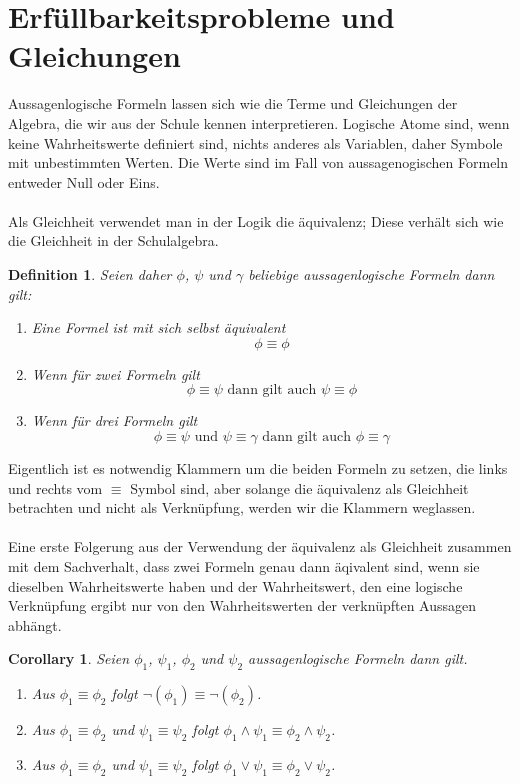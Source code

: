 \documentclass[11pt,a4paper,leqno]{report}
\newtheorem{definition}[theorem]{Definition}
\newtheorem{corollary}[theorem]{Corollary}
\numberwithin{equation}{chapter}
\begin{document}
\section{Erf\"ullbarkeitsprobleme und Gleichungen}
Aussagenlogische Formeln lassen sich wie die Terme und Gleichungen der Algebra, die wir aus der Schule kennen interpretieren. Logische Atome sind, wenn keine Wahrheitswerte definiert sind, nichts anderes als Variablen, daher Symbole mit unbestimmten Werten. Die Werte sind im Fall von aussagenogischen Formeln entweder Null oder Eins.\\
\\
Als Gleichheit verwendet man in der Logik die \"aquivalenz; Diese verh\"alt sich wie die Gleichheit in der Schulalgebra.
\begin{definition}
	Seien daher $\phi$, $\psi$ und $\gamma$ beliebige aussagenlogische Formeln dann gilt:
	\begin{enumerate}
		\item Eine Formel ist mit sich selbst \"aquivalent
		\begin{equation}
			\phi\equiv\phi
		\end{equation}
		\item Wenn f\"ur zwei Formeln gilt
		\begin{equation}
		\phi\equiv\psi \text{ dann gilt auch } \psi\equiv\phi
		\end{equation}
		\item Wenn f\"ur drei Formeln gilt
		\begin{equation}
		\phi\equiv\psi \text{ und } \psi\equiv\gamma\text{ dann gilt auch }\phi\equiv\gamma
		\end{equation}
	\end{enumerate}
\end{definition}
Eigentlich ist es notwendig Klammern um die beiden Formeln zu setzen, die links und rechts vom $\equiv$ Symbol sind, aber solange die \"aquivalenz als Gleichheit betrachten und nicht als Verkn\"upfung, werden wir die Klammern weglassen.
\\
\\
Eine erste Folgerung aus der Verwendung der \"aquivalenz als Gleichheit zusammen mit dem Sachverhalt, dass zwei Formeln genau dann \"aqivalent sind, wenn sie dieselben Wahrheitswerte haben und der Wahrheitswert, den eine logische Verkn\"upfung ergibt nur von den Wahrheitswerten der verkn\"upften Aussagen abh\"angt.
\begin{corollary}
	Seien $\phi_1$, $\psi_1$, $\phi_2$ und $\psi_2$ aussagenlogische Formeln dann gilt.
	\begin{enumerate}
		\item Aus $\phi_1\equiv\phi_2$ folgt $\neg(\phi_1)\equiv\neg(\phi_2)$.
		\item Aus $\phi_1\equiv\phi_2$ und $\psi_1\equiv\psi_2$ folgt $\phi_1\wedge\psi_1\equiv\phi_2\wedge\psi_2$.
		\item Aus $\phi_1\equiv\phi_2$ und $\psi_1\equiv\psi_2$ folgt $\phi_1\vee\psi_1\equiv\phi_2\vee\psi_2$.
	\end{enumerate}
\end{corollary}
\end{document}
